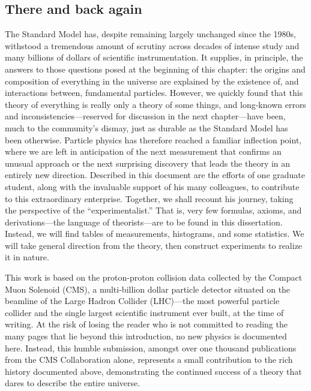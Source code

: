 \begin{dissertationintroduction}
\section*{There and back again}
The Standard Model has, despite remaining largely unchanged since the 1980s, withstood a tremendous amount of scrutiny across decades of intense study and many billions of dollars of scientific instrumentation. 
It supplies, in principle, the answers to those questions posed at the beginning of this chapter: the origins and composition of everything in the universe are explained by the existence of, and interactions between, fundamental particles. 
However, we quickly found that this theory of everything is really only a theory of some things, and long-known errors and inconsistencies---reserved for discussion in the next chapter---have been, much to the community's dismay, just as durable as the Standard Model has been otherwise. 
Particle physics has therefore reached a familiar inflection point, where we are left in anticipation of the next measurement that confirms an unusual approach or the next surprising discovery that leads the theory in an entirely new direction. 
Described in this document are the efforts of one graduate student, along with the invaluable support of his many colleagues, to contribute to this extraordinary enterprise. 
Together, we shall recount his journey, taking the perspective of the ``experimentalist.'' 
That is, very few formulas, axioms, and derivations---the language of theorists---are to be found in this dissertation. 
Instead, we will find tables of measurements, histograms, and some statistics. 
We will take general direction from the theory, then construct experiments to realize it in nature. 

This work is based on the proton-proton collision data collected by the Compact Muon Solenoid (CMS), a multi-billion dollar particle detector situated on the beamline of the Large Hadron Collider (LHC)---the most powerful particle collider and the single largest scientific instrument ever built, at the time of writing. 
At the risk of losing the reader who is not committed to reading the many pages that lie beyond this introduction, no new physics is documented here.
Instead, this humble submission, amongst over one thousand publications from the CMS Collaboration alone, represents a small contribution to the rich history documented above, demonstrating the continued success of a theory that dares to describe the entire universe.
\end{dissertationintroduction}
